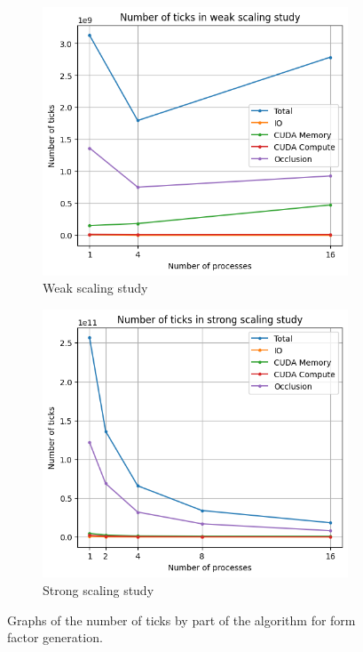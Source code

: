 \documentclass[conference]{IEEEtran}
\begin{document}
\begin{figure}
\begin{subfigure}{.49\textwidth}
\includegraphics[width=\columnwidth]{ticks_weak.png}
\caption{Weak scaling study}
\label{fig:weakgraph_ticks}
\end{subfigure}
\hspace{0.01\textwidth}
\begin{subfigure}{.49\textwidth}
\includegraphics[width=\columnwidth]{ticks_strong.png}
\caption{Strong scaling study}
\label{fig:stronggraph_ticks}
\end{subfigure}
\caption{Graphs of the number of ticks by part of the algorithm for form factor generation.}

\end{figure}
\end{document}
